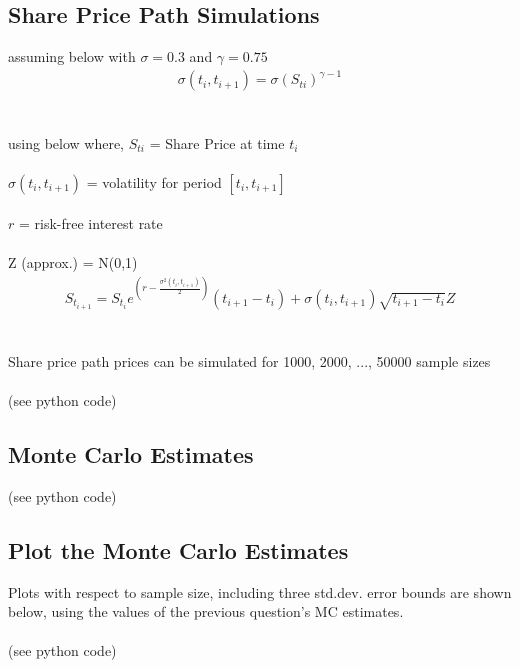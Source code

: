 \documentclass{article}
\begin{document}
\subsection{Share Price Path Simulations}
assuming below with $\sigma = 0.3$ and $\gamma = 0.75$
\begin{equation}
\begin{split}
\sigma(t_i, t_{i+1}) = \sigma(S_{ti})^{\gamma-1}
\end{split}
\end{equation}
\\\\
using below where,
$S_{ti}$ = Share Price at time $t_i$ \\\\
$\sigma(t_i, t_{i+1})$ = volatility for period $[t_i, t_{i+1}]$
\\\\
$r$ = risk-free interest rate
\\\\
Z (approx.) = N(0,1) 
\begin{equation}
\begin{split}
S_{t_{i+1}} = S_{t_i} e^{(r - \frac{\sigma^2(t_i, t_{i+1})}{2})} (t_{i+1}-t_i) + \sigma(t_i, t_{i+1}) \sqrt{t_{i+1}-t_i} Z
\end{split}
\end{equation}
\\\\
Share price path prices can be simulated for
1000, 2000, ..., 50000 sample sizes
\\\\
(see python code)



\subsection{Monte Carlo Estimates}

(see python code)

\subsection{Plot the Monte Carlo Estimates}
Plots with respect to sample size, including three std.dev. error bounds are shown below, using the values of the previous question's MC estimates.
\\\\
(see python code)
\end{document}
